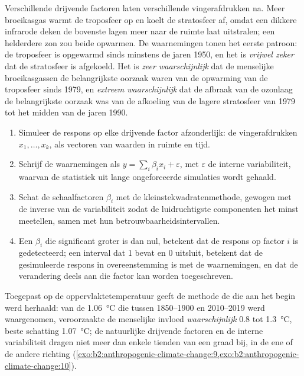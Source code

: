 Verschillende drijvende factoren laten verschillende vingerafdrukken na. Meer broeikasgas warmt de troposfeer op en koelt
de stratosfeer af, omdat een dikkere infrarode deken de bovenste lagen meer naar de ruimte laat uitstralen;
een helderdere zon zou beide opwarmen. De waarnemingen tonen het eerste patroon: de troposfeer is opgewarmd
sinds minstens de jaren 1950, en het is \emph{vrijwel zeker} dat de stratosfeer is afgekoeld. Het is
\emph{zeer waarschijnlijk} dat de menselijke broeikasgassen de belangrijkste oorzaak waren van de opwarming van de troposfeer
sinds 1979, en \emph{extreem waarschijnlijk} dat de afbraak van de ozonlaag de belangrijkste oorzaak was van
de afkoeling van de lagere stratosfeer van 1979 tot het midden van de jaren 1990.

\begin{method}\label{met:b2:anthropogenic-climate-change:fingerprinting}
\begin{enumerate}
  \item Simuleer de respons op elke drijvende factor afzonderlijk: de vingerafdrukken $x_1, \dots, x_k$, als
        vectoren van waarden in ruimte en tijd.
  \item Schrijf de waarnemingen als $y = \sum_i \beta_i x_i + \varepsilon$, met $\varepsilon$ de
        interne variabiliteit, waarvan de statistiek uit lange ongeforceerde simulaties wordt gehaald.
  \item Schat de schaalfactoren $\beta_i$ met de kleinstekwadratenmethode, gewogen met de inverse van de
        variabiliteit zodat de luidruchtigste componenten het minst meetellen, samen met hun betrouwbaarheidsintervallen.
  \item Een $\beta_i$ die significant groter is dan nul, betekent dat de respons op factor $i$ is
        gedetecteerd; een interval dat 1 bevat en 0 uitsluit, betekent dat de gesimuleerde respons
        in overeenstemming is met de waarnemingen, en dat de verandering deels aan die factor kan worden toegeschreven.
\end{enumerate}
\end{method}

Toegepast op de oppervlaktetemperatuur geeft de methode de  die aan het begin werd herhaald: van de
\qty{1.06}{\celsius} die tussen 1850--1900 en 2010--2019 werd waargenomen, veroorzaakte de menselijke invloed \emph{waarschijnlijk}
0.8 tot \qty{1.3}{\celsius}, beste schatting \qty{1.07}{\celsius}; de natuurlijke drijvende factoren en de
interne variabiliteit dragen niet meer dan enkele tienden van een graad bij, in de ene of de andere richting
(\cref{exo:b2:anthropogenic-climate-change:9,exo:b2:anthropogenic-climate-change:10}).

